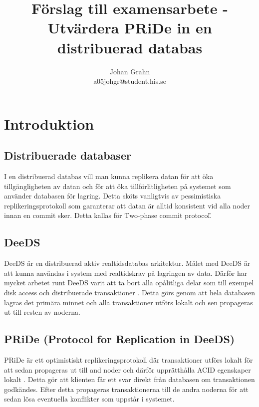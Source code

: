 \documentclass[12pt]{article}
\begin{document}
	
\title{Förslag till examensarbete - \\ Utvärdera PRiDe in en distribuerad databas}
\author{Johan Grahn \\ a05johgr@student.his.se}

\maketitle
\thispagestyle{empty}

\newpage
\thispagestyle{empty}
\tableofcontents

\newpage

\setcounter{page}{1}

\section{Introduktion}

\subsection{Distribuerade databaser} 
\label{sec:distdb}

I en distribuerad databas vill man kunna replikera datan för att öka tillgängligheten av datan och för att öka tillförlitligheten på systemet som använder databasen för lagring.  Detta sköts vanligtvis av pessimistiska replikeringsprotokoll som garanterar att datan är alltid konsistent vid alla noder innan en commit sker. Detta kallas för \"Two-phase commit protocol\". 

\subsection{DeeDS}
\label{sub:deeds}
DeeDS är en distribuerad aktiv realtidsdatabas arkitektur. Målet med DeeDS är att kunna användas i system med realtidskrav på lagringen av data. Därför har mycket arbetet runt DeeDS varit att ta bort alla opålitliga delar som till exempel disk access och distribuerade transaktioner \cite[]{deeds}. Detta görs genom att hela databasen lagras det primära minnet och alla transaktioner utförs lokalt och sen propageras ut till resten av noderna.

\subsection{PRiDe (Protocol for Replication in DeeDS)}
\label{sub:pride}

PRiDe är ett optimistiskt replikeringsprotokoll där transaktioner utförs lokalt för att sedan propageras ut till and noder och därför upprätthålla ACID egenskaper lokalt \cite[]{Syber2007}. Detta gör att klienten får ett svar direkt från databasen om transaktionen godkändes. Efter detta propageras transaktionerna till de andra noderna för att sedan lösa eventuella konflikter som uppstår i systemet.
\end{document}
